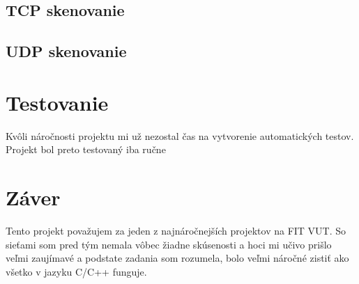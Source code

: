 \documentclass[11pt, a4paper]{article}
\begin{document}
\subsection{TCP skenovanie}


\subsection{UDP skenovanie}

\section{Testovanie}
Kvôli náročnosti projektu mi už nezostal čas na vytvorenie automatických testov. Projekt bol preto testovaný iba ručne 

\section{Záver}
Tento projekt považujem za jeden z najnáročnejších projektov na FIT VUT. So sieťami som pred tým nemala vôbec žiadne skúsenosti a hoci mi učivo prišlo veľmi zaujímavé a podstate zadania som rozumela, bolo veľmi náročné zistiť ako všetko v jazyku C/C++ funguje.

\newpage

\renewcommand{\refname}{Použitá literatúra}

\end{document}
